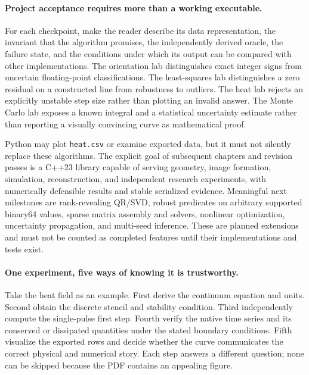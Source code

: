 \paragraph{Project acceptance requires more than a working executable.}
For each checkpoint, make the reader describe its data representation,
the invariant that the algorithm promises, the independently derived
oracle, the failure state, and the conditions under which its output
can be compared with other implementations. The orientation lab
distinguishes exact integer signs from uncertain floating-point
classifications. The least-squares lab distinguishes a zero residual
on a constructed line from robustness to outliers. The heat lab
rejects an explicitly unstable step size rather than plotting an
invalid answer. The Monte Carlo lab exposes a known integral and a
statistical uncertainty estimate rather than reporting a visually
convincing curve as mathematical proof.

Python may plot \texttt{heat.csv} or examine exported data, but it
must not silently replace these algorithms. The explicit goal of
subsequent chapters and revision passes is a C++23 library capable
of serving geometry, image formation, simulation, reconstruction,
and independent research experiments, with numerically defensible
results and stable serialized evidence. Meaningful next milestones
are rank-revealing QR/SVD, robust predicates on arbitrary supported
binary64 values, sparse matrix assembly and solvers, nonlinear
optimization, uncertainty propagation, and multi-seed inference.
These are planned extensions and must not be counted as completed
features until their implementations and tests exist.

\paragraph{One experiment, five ways of knowing it is trustworthy.}
Take the heat field as an example. First derive the continuum
equation and units. Second obtain the discrete stencil and stability
condition. Third independently compute the single-pulse first step.
Fourth verify the native time series and its conserved or dissipated
quantities under the stated boundary conditions. Fifth visualize
the exported rows and decide whether the curve communicates the
correct physical and numerical story. Each step answers a different
question; none can be skipped because the PDF contains an appealing
figure.


